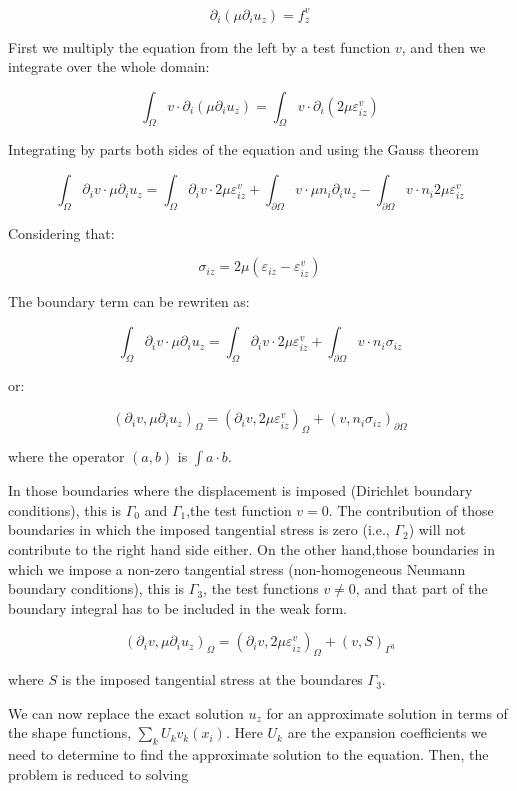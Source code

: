 \[ \partial_i \left( \mu \partial_i u_z\right) = f^v_z \]

First we multiply the equation from the left by a test function $v$, and then we integrate over the whole domain\-:

\[ \int_{\Omega} v \cdot \partial_i \left( \mu \partial_i u_z \right) = \int_{\Omega} v \cdot \partial_i \left( 2 \mu \varepsilon^v_{iz} \right) \]

Integrating by parts both sides of the equation and using the Gauss theorem

\[ \int_{\Omega} \partial_i v \cdot \mu \partial_i u_z = \int_{\Omega} \partial_i v \cdot 2 \mu \varepsilon^v_{iz} + \int_{\partial \Omega} v \cdot \mu n_i \partial_i u_z - \int_{\partial \Omega} v \cdot n_i 2 \mu \varepsilon^v_{iz} \]

Considering that\-:

\[ \sigma_{iz} = 2 \mu \left( \varepsilon_{iz} - \varepsilon^v_{iz} \right) \]

The boundary term can be rewriten as\-:

\[ \int_{\Omega} \partial_i v \cdot \mu \partial_i u_z = \int_{\Omega} \partial_i v \cdot 2 \mu \varepsilon^v_{iz} + \int_{\partial \Omega} v \cdot n_i \sigma_{iz} \]

or\-:

\[ \left( \partial_i v, \mu \partial_i u_z \right)_{\Omega} = \left( \partial_i v, 2 \mu \varepsilon^v_{iz} \right)_{\Omega} + \left(v, n_i \sigma_{iz} \right)_{\partial \Omega} \]

where the operator $(a, b)$ is $ \int a \cdot b $.

In those boundaries where the displacement is imposed (Dirichlet boundary conditions), this is $\Gamma_0$ and $\Gamma_1$,the test function $v = 0$. The contribution of those boundaries in which the imposed tangential stress is zero (i.\-e., $\Gamma_2$) will not contribute to the right hand side either. On the other hand,those boundaries in which we impose a non-\/zero tangential stress (non-\/homogeneous Neumann boundary conditions), this is $\Gamma_3$, the test functions $v \neq 0$, and that part of the boundary integral has to be included in the weak form.

\[ \left( \partial_i v, \mu \partial_i u_z \right)_{\Omega} = \left( \partial_i v, 2 \mu \varepsilon^v_{iz} \right)_{\Omega} + \left(v, S \right)_{\Gamma^3} \]

where $S$ is the imposed tangential stress at the boundares $ \Gamma_3 $.

We can now replace the exact solution $ u_z $ for an approximate solution in terms of the shape functions, $ \sum_{k} U_k v_k(x_i) $. Here $U_k$ are the expansion coefficients we need to determine to find the approximate solution to the equation. Then, the problem is reduced to solving

